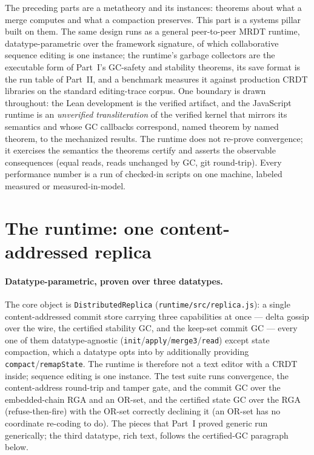 \documentclass[11pt]{article}
\newcommand{\code}[1]{\texttt{#1}}
\begin{document}
The preceding parts are a metatheory and its instances: theorems about
what a merge computes and what a compaction preserves. This part is a
systems pillar built on them. The same design runs as a general
peer-to-peer MRDT runtime, datatype-parametric over the framework
signature, of which collaborative sequence editing is one instance; the
runtime's garbage collectors are the executable form of Part~I's
GC-safety and stability theorems, its save format is the run table of
Part~II, and a benchmark measures it against production CRDT libraries on
the standard editing-trace corpus. One boundary is drawn throughout: the
Lean development is the verified artifact, and the JavaScript runtime is
an \emph{unverified transliteration} of the verified kernel that mirrors
its semantics and whose GC callbacks correspond, named theorem by named
theorem, to the mechanized results. The runtime does not re-prove
convergence; it exercises the semantics the theorems certify and asserts
the observable consequences (equal reads, reads unchanged by GC, git
round-trip). Every performance number is a run of checked-in scripts on
one machine, labeled measured or measured-in-model.

\section{The runtime: one content-addressed replica}
\label{sec:runtime}

\paragraph{Datatype-parametric, proven over three datatypes.} The core
object is \code{DistributedReplica} (\code{runtime/src/replica.js}): a
single content-addressed commit store carrying
three capabilities at once --- delta gossip over the wire, the certified
stability GC, and the keep-set commit GC --- every one of them
datatype-agnostic (\code{init}/\code{apply}/\code{merge3}/\code{read})
except state compaction, which a datatype opts into by additionally
providing \code{compact}/\code{remapState}. The runtime is therefore not
a text editor with a CRDT inside; sequence editing is one instance. The
test suite runs convergence, the content-address round-trip and tamper
gate, and the commit GC over the embedded-chain RGA and an
OR-set, and the certified state GC over the RGA (refuse-then-fire) with
the OR-set correctly declining it (an OR-set has no coordinate re-coding
to do). The pieces that Part~I proved generic run generically; the
third datatype, rich text, follows the certified-GC paragraph below.
\end{document}
